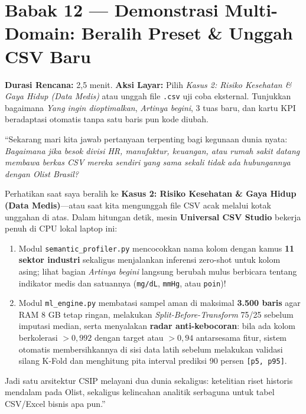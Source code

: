 \documentclass[11pt,a4paper,oneside]{book}
\newcommand{\code}[1]{{\small\nolinkurl{#1}}}
\begin{document}
\section{Babak 12 --- Demonstrasi Multi-Domain: Beralih Preset \& Unggah CSV Baru}

\begin{stagebox}
\textbf{Durasi Rencana:} 2,5 menit. \quad \textbf{Aksi Layar:} Pilih \emph{Kasus 2: Risiko Kesehatan \& Gaya Hidup (Data Medis)} atau unggah file \code{.csv} uji coba eksternal. Tunjukkan bagaimana \emph{Yang ingin dioptimalkan}, \emph{Artinya begini}, 3 tuas baru, dan kartu KPI beradaptasi otomatis tanpa satu baris pun kode diubah.
\end{stagebox}

\begin{scriptbox}
``Sekarang mari kita jawab pertanyaan terpenting bagi kegunaan dunia nyata: \emph{Bagaimana jika besok divisi HR, manufaktur, keuangan, atau rumah sakit datang membawa berkas CSV mereka sendiri yang sama sekali tidak ada hubungannya dengan Olist Brasil?}

Perhatikan saat saya beralih ke \textbf{Kasus 2: Risiko Kesehatan \& Gaya Hidup (Data Medis)}---atau saat kita mengunggah file CSV acak melalui kotak unggahan di atas. Dalam hitungan detik, mesin \textbf{Universal CSV Studio} bekerja penuh di CPU lokal laptop ini:
\begin{enumerate}
  \item Modul \code{semantic_profiler.py} mencocokkan nama kolom dengan kamus \textbf{11 sektor industri} sekaligus menjalankan inferensi zero-shot untuk kolom asing; lihat bagian \emph{Artinya begini} langsung berubah mulus berbicara tentang indikator medis dan satuannya (\code{mg/dL}, \code{mmHg}, atau \code{poin})!
  \item Modul \code{ml_engine.py} membatasi sampel aman di maksimal \textbf{3.500 baris} agar RAM 8 GB tetap ringan, melakukan \emph{Split-Before-Transform} 75/25 sebelum imputasi median, serta menyalakan \textbf{radar anti-kebocoran}: bila ada kolom berkolerasi $> 0{,}992$ dengan target atau $> 0{,}94$ antarsesama fitur, sistem otomatis membersihkannya di sisi data latih sebelum melakukan validasi silang K-Fold dan menghitung pita interval prediksi 90 persen \code{[p5, p95]}.
\end{enumerate}
Jadi satu arsitektur CSIP melayani dua dunia sekaligus: ketelitian riset historis mendalam pada Olist, sekaligus kelincahan analitik serbaguna untuk tabel CSV/Excel bisnis apa pun.''
\end{scriptbox}
\end{document}
